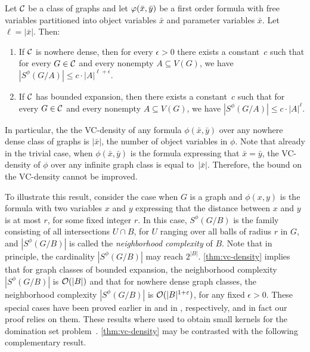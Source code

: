 \begin{theorem}\label{thm:vc-density}
Let $\mathcal{C}$ be a class of graphs and let $\varphi(\bar{x},\bar{y})$ be a first order formula
with free variables  partitioned  into object variables $\bar x$  and parameter variables $\bar x$. Let $\ell=|\bar x|$. Then:
\begin{enumerate}
\item If $\mathcal{C}$ is nowhere dense, then for every $\epsilon>0$ 
there exists a constant~$c$ such that for every $G\in \mathcal{C}$ and every nonempty
$A\subseteq V(G)$, we have $|S^\phi(G/A)|\leq c\cdot |A|^{\ell+\epsilon}.$

\item If $\mathcal{C}$ has bounded expansion, then there exists a constant~$c$ such that for every $G\in \mathcal{C}$ and every nonempty $A\subseteq V(G)$, we have $|S^\phi(G/A)|\leq c\cdot |A|^\ell$.
\end{enumerate}
\end{theorem} 
In particular,
the the VC-density of any formula 
$\phi(\bar x,\bar y)$ over any nowhere dense class of graphs is $|\bar x|$, the number of object variables in $\phi$.
Note that already in the trivial case, when $\phi(\bar x,\bar y)$ is the formula expressing that $\bar x=\bar y$,
the VC-density of $\phi$ over any infinite graph class is 
equal to~$|\bar x|$. Therefore, the bound on the VC-density cannot be improved.



\medskip
To illustrate this result, consider the  case when
$G$ is a graph and  $\phi(x,y)$ is the formula with two variables $x$ and $y$ expressing that the distance between $x$ and $y$
is at most $r$, for some fixed integer $r$. In this case, $S^\phi(G/B)$ is the family consisting of all intersections $U\cap B$, for $U$ ranging over all balls of radius  $r$ in $G$,
and  $|S^\phi(G/B)|$ is called the \emph{neighborhood complexity} of $B$. 
Note that in principle, the cardinality $|S^\phi(G/B)|$ may reach $2^{|B|}$. 
\cref{thm:vc-density} implies 
that 
for graph classes of bounded expansion,
the neighborhood complexity $|S^\phi(G/B)|$ is $\mathcal{O}(|B|)$
and that for nowhere dense graph classes,
the neighborhood complexity $|S^\phi(G/B)|$ is $\mathcal{O}(|B|^{1+\varepsilon})$,
 for any fixed $\epsilon>0$.
 These special cases have been proved earlier in \cite{DrangeDFKLPPRVS16} and in 
 \cite{eickmeyer2016neighborhood}, respectively, and in fact our proof relies on them.  
 These results where used 
 to obtain small kernels for the domination set problem~\cite{DrangeDFKLPPRVS16,eickmeyer2016neighborhood}.
   \cref{thm:vc-density} may be contrasted with the following complementary result.

